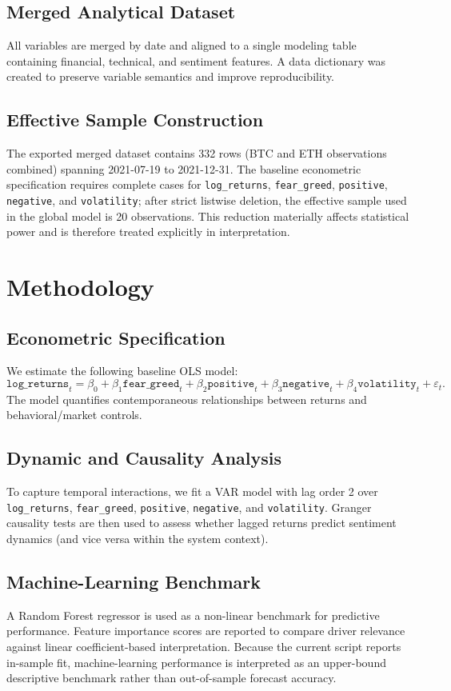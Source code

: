 \documentclass[12pt]{article}
\begin{document}
\subsection{Merged Analytical Dataset}
All variables are merged by date and aligned to a single modeling table containing financial, technical, and sentiment features. A data dictionary was created to preserve variable semantics and improve reproducibility.

\subsection{Effective Sample Construction}
The exported merged dataset contains 332 rows (BTC and ETH observations combined) spanning 2021-07-19 to 2021-12-31. The baseline econometric specification requires complete cases for \texttt{log\_returns}, \texttt{fear\_greed}, \texttt{positive}, \texttt{negative}, and \texttt{volatility}; after strict listwise deletion, the effective sample used in the global model is 20 observations. This reduction materially affects statistical power and is therefore treated explicitly in interpretation.

\section{Methodology}
\subsection{Econometric Specification}
We estimate the following baseline OLS model:
\[
\texttt{log\_returns}_t = \beta_0 + \beta_1 \texttt{fear\_greed}_t + \beta_2 \texttt{positive}_t + \beta_3 \texttt{negative}_t + \beta_4 \texttt{volatility}_t + \varepsilon_t.
\]
The model quantifies contemporaneous relationships between returns and behavioral/market controls.

\subsection{Dynamic and Causality Analysis}
To capture temporal interactions, we fit a VAR model with lag order 2 over \texttt{log\_returns}, \texttt{fear\_greed}, \texttt{positive}, \texttt{negative}, and \texttt{volatility}. Granger causality tests are then used to assess whether lagged returns predict sentiment dynamics (and vice versa within the system context).

\subsection{Machine-Learning Benchmark}
A Random Forest regressor is used as a non-linear benchmark for predictive performance. Feature importance scores are reported to compare driver relevance against linear coefficient-based interpretation. Because the current script reports in-sample fit, machine-learning performance is interpreted as an upper-bound descriptive benchmark rather than out-of-sample forecast accuracy.
\end{document}
